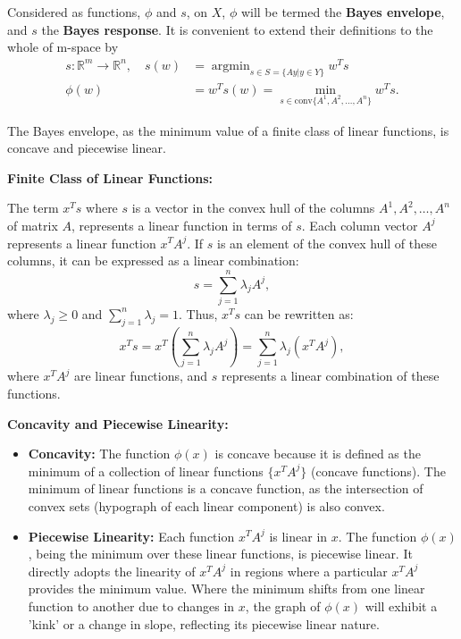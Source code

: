 \documentclass[11pt]{article}
\DeclareMathOperator*{\argmin}{argmin}
\theoremstyle{boldStyle}
\begin{document}
Considered as functions, $\phi$ and $s$, on $X$, $\phi$ will be termed the \textbf{Bayes envelope}, and $s$ the \textbf{Bayes response}.
It is convenient to extend their definitions to the whole of m-space by 
\begin{equation} \label{eq:9}
    \begin{aligned}
        s : \mathbb{R}^m \rightarrow \mathbb{R}^n, \quad s(w) &= \argmin_{s \in S = \{Ay | y \in Y \}} w^T s \\
        \phi(w) &=  w^T s(w) = \min_{s \in \text{conv}\{A^1, A^2, \ldots, A^n\}} w^T s.
    \end{aligned}
\end{equation}


\begin{bluebox}
    The Bayes envelope, as the minimum value of a finite class of linear functions, is concave and piecewise linear.
\end{bluebox}

\textbf{Finite Class of Linear Functions:}

The term \(x^T s\) where \(s\) is a vector in the convex hull of the columns \(A^1, A^2, \ldots, A^n\) of matrix \(A\), represents a linear function in terms of \(s\). Each column vector \(A^j\) represents a linear function \(x^T A^j\). If \(s\) is an element of the convex hull of these columns, it can be expressed as a linear combination:
\[
s = \sum_{j=1}^n \lambda_j A^j,
\]
where \(\lambda_j \geq 0\) and \(\sum_{j=1}^n \lambda_j = 1\). Thus, \(x^T s\) can be rewritten as:
\[
x^T s = x^T \left(\sum_{j=1}^n \lambda_j A^j\right) = \sum_{j=1}^n \lambda_j (x^T A^j),
\]
where \(x^T A^j\) are linear functions, and \(s\) represents a linear combination of these functions.

\textbf{Concavity and Piecewise Linearity:}

\begin{itemize}
    \item \textbf{Concavity:} The function \(\phi(x)\) is concave because it is defined as the minimum of a collection of 
        linear functions \(\{x^T A^j\}\) (concave functions).
        The minimum of linear functions is a concave function, as the intersection of convex sets (hypograph of each linear component) is also convex.

    \item \textbf{Piecewise Linearity:} Each function \(x^T A^j\) is linear in \(x\). 
        The function \(\phi(x)\), being the minimum over these linear functions, is piecewise linear. 
        It directly adopts the linearity of \(x^T A^j\) in regions where a particular \(x^T A^j\) provides the minimum value. 
        Where the minimum shifts from one linear function to another due to changes in \(x\), the graph of \(\phi(x)\) will exhibit 
        a 'kink' or a change in slope, reflecting its piecewise linear nature.
\end{itemize}
\end{document}
